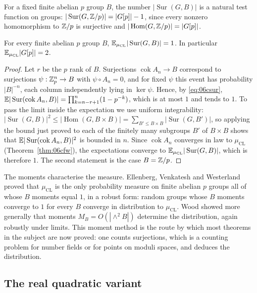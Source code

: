For a fixed finite abelian $p$ group $B$, the number $|\operatorname{Sur}(G,B)|$ is a natural test function on groups: $|\operatorname{Sur}(G,\mathbb{Z}/p)| = |G[p]|-1$, since every nonzero homomorphism to $\mathbb{Z}/p$ is surjective and $|\operatorname{Hom}(G,\mathbb{Z}/p)| = |G[p]|$.

\begin{proposition}\label{prop:06cmoments}
For every finite abelian $p$ group $B$, $\mathbb{E}_{\mu_{\mathrm{CL}}}|\operatorname{Sur}(G,B)| = 1$. In particular $\mathbb{E}_{\mu_{\mathrm{CL}}}|G[p]| = 2$.
\end{proposition}

\begin{proof}
Let $r$ be the $p$ rank of $B$. Surjections $\operatorname{cok}A_n\to B$ correspond to surjections $\psi:\mathbb{Z}_p^n\to B$ with $\psi\circ A_n = 0$, and for fixed $\psi$ this event has probability $|B|^{-n}$, each column independently lying in $\ker\psi$. Hence, by \eqref{eq:06csur}, $\mathbb{E}|\operatorname{Sur}(\operatorname{cok}A_n,B)| = \prod_{k=n-r+1}^n(1-p^{-k})$, which is at most $1$ and tends to $1$. To pass the limit inside the expectation we use uniform integrability: $|\operatorname{Sur}(G,B)|^2\le|\operatorname{Hom}(G,B\times B)| = \sum_{B'\le B\times B}|\operatorname{Sur}(G,B')|$, so applying the bound just proved to each of the finitely many subgroups $B'$ of $B\times B$ shows that $\mathbb{E}|\operatorname{Sur}(\operatorname{cok}A_n,B)|^2$ is bounded in $n$. Since $\operatorname{cok}A_n$ converges in law to $\mu_{\mathrm{CL}}$ (Theorem~\ref{thm:06cfw}), the expectations converge to $\mathbb{E}_{\mu_{\mathrm{CL}}}|\operatorname{Sur}(G,B)|$, which is therefore $1$. The second statement is the case $B = \mathbb{Z}/p$.
\end{proof}

The moments characterise the measure. Ellenberg, Venkatesh and Westerland \cite{evw2016} proved that $\mu_{\mathrm{CL}}$ is the only probability measure on finite abelian $p$ groups all of whose $B$ moments equal $1$, in a robust form: random groups whose $B$ moments converge to $1$ for every $B$ converge in distribution to $\mu_{\mathrm{CL}}$. Wood \cite{wood2017} showed more generally that moments $M_B = O(|\wedge^2B|)$ determine the distribution, again robustly under limits. This moment method is the route by which most theorems in the subject are now proved: one counts surjections, which is a counting problem for number fields or for points on moduli spaces, and deduces the distribution.

\subsection{The real quadratic variant}

